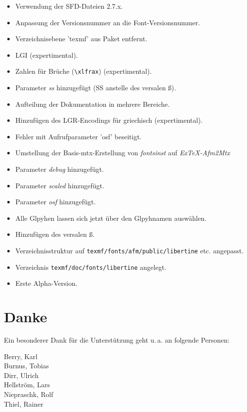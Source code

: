 \begin{description}
\item [08. Januar 2008]
\begin{itemize}
\item Verwendung der SFD-Dateien 2.7.x.
\item Anpassung der Versionsnummer an die Font-Versionsnummer.
\item Verzeichnisebene 'texmf' aus Paket entfernt.
\item LGI (expertimental).
\item Zahlen für Brüche (\verb|\xlfrax|) (expertimental).
\item Parameter \emph{ss} hinzugefügt (SS anstelle des versalen ß).
\item Aufteilung der Dokumentation in mehrere Bereiche.
\item Hinzufügen des LGR-Encodings für griechisch (expertimental).
\item Fehler mit Aufrufparameter 'osf' beseitigt.
\end{itemize}
\item [11. Juni 2007]
\begin{itemize}
\item Umstellung der Basis-mtx-Erstellung von \emph{fontsinst} auf \emph{ExTeX-Afm2Mtx}
\item Parameter \emph{debug} hinzugefügt.
\item Parameter \emph{scaled} hinzugefügt.
\item Parameter \emph{osf} hinzugefügt.
\item Alle Glpyhen lassen sich jetzt über den Glpyhnamen auswählen.
\item Hinzufügen des versalen ß.
\item Verzeichnisstruktur auf \texttt{texmf/fonts/afm/public/libertine} etc. angepasst.
\item Verzeichnis \texttt{texmf/doc/fonts/libertine} angelegt.
\end{itemize}
\item[1. Mai 2007]
\begin{itemize}
\item Erste Alpha-Version.
\end{itemize}
\end{description}

\section{Danke}

Ein besonderer Dank für die Unterstützung geht u.\,a. an folgende Personen:

\begin{multicols}{2}
Berry, Karl\\
Burnus, Tobias\\
Dirr, Ulrich\\
Hellström, Lars\\
Niepraschk, Rolf\\
Thiel, Rainer\\
\end{multicols}

\endinput
